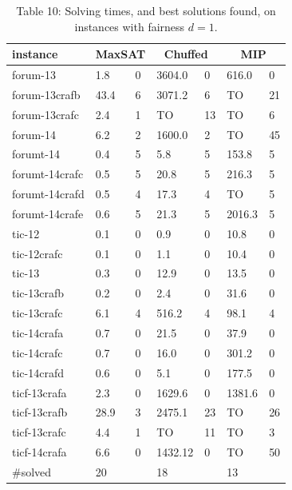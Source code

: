 \documentclass[10pt]{article}
\begin{document}
\begin{table}[h]
\begin{center}
\captionsetup{labelformat=empty}
\caption{Table 10: Solving times, and best solutions found, on instances with fairness $d=1$.}
\begin{tabular}{|l|l|l|l|l|l|l|}
\hline
instance & \multicolumn{2}{|c|}{MaxSAT} & \multicolumn{2}{|c|}{Chuffed} & \multicolumn{2}{|c|}{MIP} \\
\hline
forum-13 & 1.8 & 0 & 3604.0 & 0 & 616.0 & 0 \\
\hline
forum-13crafb & 43.4 & 6 & 3071.2 & 6 & TO & 21 \\
\hline
forum-13crafc & 2.4 & 1 & TO & 13 & TO & 6 \\
\hline
forum-14 & 6.2 & 2 & 1600.0 & 2 & TO & 45 \\
\hline
forumt-14 & 0.4 & 5 & 5.8 & 5 & 153.8 & 5 \\
\hline
forumt-14crafc & 0.5 & 5 & 20.8 & 5 & 216.3 & 5 \\
\hline
forumt-14crafd & 0.5 & 4 & 17.3 & 4 & TO & 5 \\
\hline
forumt-14crafe & 0.6 & 5 & 21.3 & 5 & 2016.3 & 5 \\
\hline
tic-12 & 0.1 & 0 & 0.9 & 0 & 10.8 & 0 \\
\hline
tic-12crafc & 0.1 & 0 & 1.1 & 0 & 10.4 & 0 \\
\hline
tic-13 & 0.3 & 0 & 12.9 & 0 & 13.5 & 0 \\
\hline
tic-13crafb & 0.2 & 0 & 2.4 & 0 & 31.6 & 0 \\
\hline
tic-13crafc & 6.1 & 4 & 516.2 & 4 & 98.1 & 4 \\
\hline
tic-14crafa & 0.7 & 0 & 21.5 & 0 & 37.9 & 0 \\
\hline
tic-14crafc & 0.7 & 0 & 16.0 & 0 & 301.2 & 0 \\
\hline
tic-14crafd & 0.6 & 0 & 5.1 & 0 & 177.5 & 0 \\
\hline
ticf-13crafa & 2.3 & 0 & 1629.6 & 0 & 1381.6 & 0 \\
\hline
ticf-13crafb & 28.9 & 3 & 2475.1 & 23 & TO & 26 \\
\hline
ticf-13crafc & 4.4 & 1 & TO & 11 & TO & 3 \\
\hline
ticf-14crafa & 6.6 & 0 & 1432.12 & 0 & TO & 50 \\
\hline
\#solved & 20 &  & 18 &  & 13 &  \\
\hline
\end{tabular}
\end{center}
\end{table}
\end{document}
